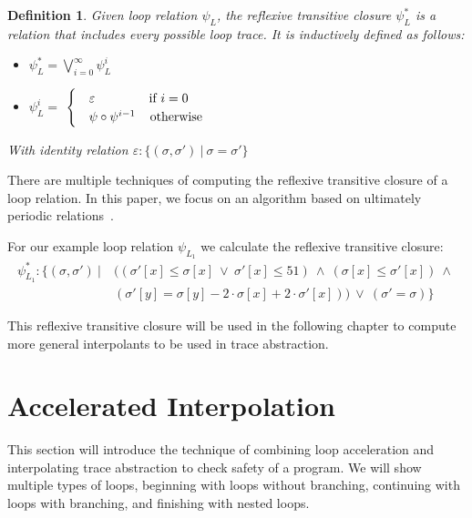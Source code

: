 \documentclass{article}
\newcounter{example}[section]
\newtheorem{mydef}{Definition}
\newcommand\mycom[1]{}
\newcommand\mycom[1]{#1}
\newcommand{\dd}[1]{\mycom{\todo[color=orange!40,inline]{\small DD: #1}}}
\newcommand{\ts}[1]{\mycom{\todo[color=green!40,inline]{\small TS: #1}}}
\begin{document}
\begin{mydef}
	Given loop relation $\psi_L$, the reflexive transitive closure $\psi_L^*$ is a relation that includes every possible loop trace. It is inductively defined as follows:
	\begin{itemize}
		\item $\psi^*_L = \bigvee_{i=0}^\infty \psi^i_L$
		\item $\psi^i_L = $
		      $\begin{cases}
				       & \varepsilon \hspace{1.5cm} \text{if}\ i = 0            \\
				       & \psi \circ \psi^{i - 1} \hspace{0.4cm}\text{otherwise}
			      \end{cases}$
	\end{itemize}
	With identity relation $\varepsilon: \{(\sigma, \sigma')\ |\ \sigma = \sigma'\}$
\end{mydef}
\ts{In the definition, only define reflexive transitive closure, and \emph{afterwards} write what it means here (...every possible loop trace...).}
\dd{You missed some $L$s}
There are multiple techniques of computing the reflexive transitive closure of a loop relation.
In this paper, we focus on an algorithm based on ultimately periodic relations~\cite{JillThesis}.

For our example loop relation $\psi_{L_1}$ we calculate the reflexive transitive closure:
\begin{align*}
	\psi^*_{L_1}: \{(\sigma, \sigma') \  |\  & ((\sigma'[x] \leq \sigma[x]\ \lor\ \sigma'[x] \leq 51)\ \land\ (\sigma[x] \leq \sigma'[x])\ \land\ \\ & (\sigma'[y] = \sigma[y] - 2 \cdot \sigma[x] + 2\cdot \sigma'[x]))\ \lor\ (\sigma' = \sigma) \}
\end{align*}
\newcommand{\rtc}[1]{\ensuremath{\psi^*_{#1}}}
\dd{Are you really sure this is the correct $\rtc{L_1}$?}
This reflexive transitive closure will be used in the following chapter to compute more general interpolants to be used in trace abstraction.

\section{Accelerated Interpolation}\label{sec:accelinterpol}
This section will introduce the technique of combining loop acceleration and interpolating trace abstraction to check safety of a program.
We will show multiple types of loops, beginning with loops without branching, continuing with loops with branching, and finishing with nested loops.
\end{document}
